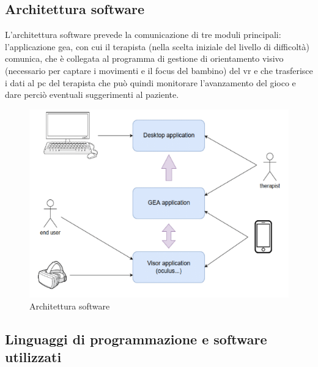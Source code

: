 \subsection{Architettura software} \label{subsec:soft}
L'architettura software prevede la comunicazione di tre moduli principali: l'applicazione \acs{gea}, con cui il terapista (nella scelta iniziale del livello di difficoltà) comunica, che è collegata al programma di gestione di orientamento visivo (necessario per captare i movimenti e il focus del bambino) del \acs{vr} e che trasferisce i dati al \acs{pc} del terapista che può quindi monitorare l'avanzamento del gioco e dare perciò eventuali suggerimenti al paziente.
\vspace{70pt}
\begin{figure}[htbp]
\centering
\includegraphics[width=\textwidth]{Images/software}
\caption{Architettura software}
\label{fig:software}
\end{figure}
\clearpage

\subsection{Linguaggi di programmazione e software utilizzati} \label{subsec:ling}